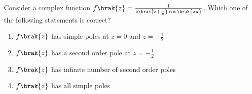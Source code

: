 \item Consider a complex function $f\brak{z}=\frac{1}{z\brak{z+\frac{1}{z}}\cos\brak{z\pi}}$. Which one of the following statements is correct?

\begin{enumerate}
    \item $f\brak{z}$ has simple poles at $z=0$ and $z=-\frac{1}{2}$
    \item $f\brak{z}$ has a second order pole at $z=-\frac{1}{2}$
    \item $f\brak{z}$ has infinite number of second order poles
    \item $f\brak{z}$ has all simple poles
\end{enumerate}




